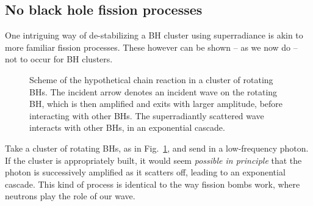\documentclass[11pt]{article}
\numberwithin{equation}{section} %
\begin{document}
\subsection{No black hole fission processes}
One intriguing way of de-stabilizing a BH cluster using superradiance
is akin to more familiar fission processes. These however can be shown -- as we now do -- not to occur
for BH clusters.
%
\begin{figure}[ht]
\begin{center}
\caption{Scheme of the hypothetical chain reaction in a cluster of rotating BHs. The incident
arrow denotes an incident wave on the rotating BH, which is then amplified and exits with larger amplitude, before interacting with other BHs.
The superradiantly scattered wave interacts with other BHs, in an exponential cascade.
\label{fig:chainreaction}}
\end{center}
\end{figure}
%
Take a cluster of rotating BHs, as in Fig.~\ref{fig:chainreaction}, and send in a low-frequency photon. If the cluster is appropriately built, it would seem {\it possible in principle} that the photon is successively amplified as it scatters off, leading to an exponential cascade. This kind of process is identical to the way fission bombs work, where neutrons play the role of our wave.
\end{document}

